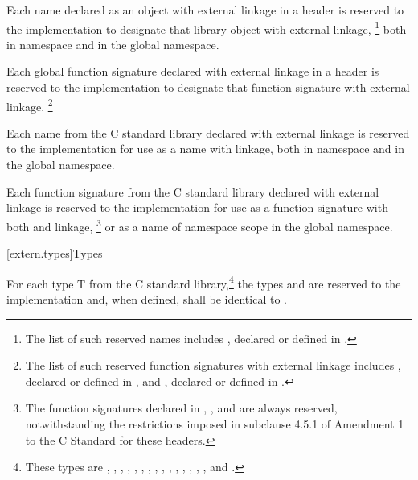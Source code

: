 \pnum
Each name declared as an object with external linkage
%
in a header is reserved to the implementation to designate that library
object with external linkage,%
\footnote{The list of such reserved names includes
,
declared or defined in
%
%
.}
both in namespace
and in the global namespace.

\pnum
Each
%
global function signature declared with
%
external linkage in a header is reserved to the
implementation to designate that function signature with
%
external linkage.
\footnote{The list of such reserved function
signatures with external linkage includes
%
,
declared or defined in
%
,
and
%
%
,
declared or defined in
%
.}

\pnum
Each name from the C standard library declared with external linkage
%
is reserved to the implementation for use as a name with
%
%
linkage,
both in namespace  and in the global namespace.

\pnum
Each function signature from the C standard library declared with
%
external linkage
is reserved to the implementation for use as
a function signature with both
%
and
%
linkage,
\footnote{
The function
signatures declared in
%
%
%
%
%
%
, 
,
and
are always reserved, notwithstanding the restrictions imposed in subclause
4.5.1 of Amendment 1 to the C Standard for these headers.}
or as a name of namespace scope in the global namespace.

[extern.types]{Types}

\pnum
For each type T from the C standard library,\footnote{These types are
,
,
,
,
,
,
,
,
,
,
,
,
,
,
,
and
.}
the types
and
are reserved to the implementation and, when defined,
shall be identical to
.

